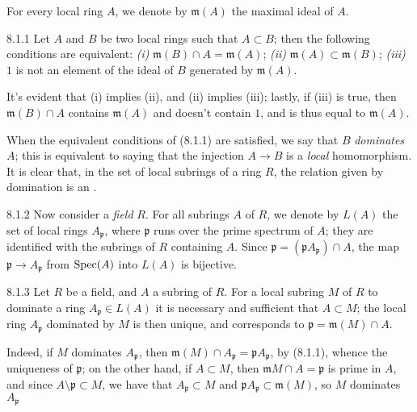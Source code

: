 \documentclass[../main.tex]{subfiles}
\begin{document}
For every local ring $A$, we denote by $\mathfrak{m}(A)$ the maximal ideal of $A$.

\begin{cx}[Lemma]{8.1.1}
    Let $A$ and $B$ be two local rings such that $A\subset B$; then the following conditions are equivalent: \emph{(i)} $\mathfrak{m}(B)\cap A=\mathfrak{m}(A)$; \emph{(ii)} $\mathfrak{m}(A)\subset\mathfrak{m}(B)$; \emph{(iii)} $1$ is not an element of the ideal of $B$ generated by $\mathfrak{m}(A)$.
\end{cx}

It's evident that (i) implies (ii), and (ii) implies (iii); lastly, if (iii) is true, then $\mathfrak{m}(B)\cap A$ contains $\mathfrak{m}(A)$ and doesn't contain $1$, and is thus equal to $\mathfrak{m}(A)$.

When the equivalent conditions of (8.1.1) are satisfied, we say that $B$ \emph{dominates} $A$; this is equivalent to saying that the injection $A\to B$ is a \emph{local} homomorphism.
It is clear that, in the set of local subrings of a ring $R$, the relation given by domination is an .

\begin{cx}{8.1.2}
    Now consider a \emph{field} $R$.
    For all subrings $A$ of $R$, we denote by $L(A)$ the set of local rings $A_\mathfrak{p}$, where $\mathfrak{p}$ runs over the prime spectrum of $A$; they are identified with the subrings of $R$ containing $A$.
    Since $\mathfrak{p}=(\mathfrak{p}A_\mathfrak{p})\cap A$, the map $\mathfrak{p}\to A_\mathfrak{p}$ from $\operatorname*{Spec}(A)$ into $L(A)$ is bijective.
\end{cx}

\begin{cx}[Lemma]{8.1.3}
    Let $R$ be a field, and $A$ a subring of $R$.
    For a local subring $M$ of $R$ to dominate a ring $A_\mathfrak{p}\in L(A)$ it is necessary and sufficient that $A\subset M$; the local ring $A_\mathfrak{p}$ dominated by $M$ is then unique, and corresponds to $\mathfrak{p}=\mathfrak{m}(M)\cap A$.
\end{cx}

Indeed, if $M$ dominates $A_\mathfrak{p}$, then $\mathfrak{m}(M)\cap A_\mathfrak{p}=\mathfrak{p}A_\mathfrak{p}$, by (8.1.1), whence the uniqueness of $\mathfrak{p}$; on the other hand, if $A\subset M$, then $\mathfrak{m}M\cap A=\mathfrak{p}$ is prime in $A$, and since $A\setminus\mathfrak{p}\subset M$, we have that $A_\mathfrak{p}\subset M$ and $\mathfrak{p}A_\mathfrak{p}\subset\mathfrak{m}(M)$, so $M$ dominates $A_\mathfrak{p}$
\end{document}
